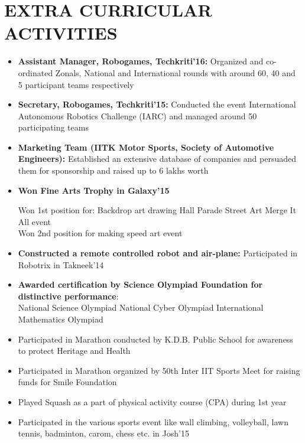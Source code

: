 \documentclass[11pt,a4paper,roman]{moderncv}        %
\begin{document}
{{{{{{{{\section{EXTRA CURRICULAR ACTIVITIES}
\begin{minipage}{1.16\maincolumnwidth}%
	\small{
    	\begin{itemize}
          \item \textbf{Assistant Manager, Robogames, Techkriti’16:} Organized and co-ordinated Zonals, National and International rounds with around 60, 40 and 5 participant teams respectively
          \item \textbf {Secretary, Robogames, Techkriti’15:} Conducted the event International Autonomous Robotics Challenge (IARC) and managed around 50 participating teams
          \item \textbf{Marketing Team (IITK Motor Sports, Society of Automotive Engineers):} Established an extensive database of companies and persuaded them for sponsorship and raised up to 6 lakhs worth
          \item \textbf{Won Fine Arts Trophy in Galaxy’15} 
               \begin{itemize} {Won 1st position for:}\hspace{0.4cm}
              \textbullet Backdrop art drawing\hspace{0.4cm} 
              \textbullet Hall Parade\hspace{0.4cm}                
              \textbullet Street Art\hspace{0.4cm} 
              \textbullet Merge It All event \\
          Won 2nd position for making speed art event 
           \end{itemize} 
        \item \textbf{Constructed a remote controlled robot and air-plane: } Participated in Robotrix in Takneek'14 
        
        \item \textbf{Awarded certification by Science Olympiad Foundation for distinctive performance}: \\ \textbullet National Science Olympiad \hspace{0.7cm}\textbullet National Cyber Olympiad \hspace{0.7cm}\textbullet International Mathematics Olympiad
        \item Participated in Marathon conducted by K.D.B. Public School for awareness to protect Heritage and Health 
        \item Participated in Marathon organized by 50th Inter IIT Sports Meet for raising funds for Smile Foundation
        \item Played Squash as a part of physical activity course (CPA) during 1st year
        \item	Participated in the various sports event like wall climbing, volleyball, lawn tennis, badminton, carom, chess etc. in Josh’15


\end{itemize}}
\end{minipage}}}}}}}}}
\end{document}
